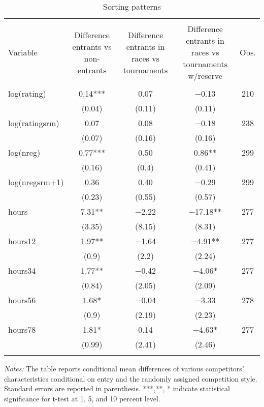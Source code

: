 \documentclass[11pt, titlepage]{article}
\begin{document}
\begin{table}
\centering
\caption{Sorting patterns}
\label{sorting table}
\begin{tabular}{@{}lcccc}
  \\[-1.8ex]\hline\hline\\[-1.8ex]
Variable & \multicolumn{1}{L{2cm}}{Difference entrants vs non-entrants} & \multicolumn{1}{L{2cm}}{Difference entrants in races vs tournaments} & \multicolumn{1}{L{2cm}}{Difference entrants in races vs tournaments w/reserve} & Obs. \\ 
  \hline\\[-1.86ex]
log(rating) &  0.14*** &  0.07 &  $-$0.13 & 210 \\ 
   & (0.04) & (0.11) & (0.11) &  \\ 
  log(ratingsrm) &  0.07 &  0.08 &  $-$0.18 & 238 \\ 
   & (0.07) & (0.16) & (0.16) &  \\ 
  log(nreg) &  0.77*** &  0.50 &   0.86** & 299 \\ 
   & (0.16) & (0.4) & (0.41) &  \\ 
  log(nregsrm+1) &  0.36 &  0.40 &  $-$0.29 & 299 \\ 
   & (0.23) & (0.55) & (0.57) &  \\ 
  hours &  7.31** & $-$2.22 & $-$17.18** & 277 \\ 
   & (3.35) & (8.15) & (8.31) &  \\ 
  hours12 &  1.97** & $-$1.64 &  $-$4.91** & 277 \\ 
   & (0.9) & (2.2) & (2.24) &  \\ 
  hours34 &  1.77** & $-$0.42 &  $-$4.06* & 277 \\ 
   & (0.84) & (2.05) & (2.09) &  \\ 
  hours56 &  1.68* & $-$0.04 &  $-$3.33 & 278 \\ 
   & (0.9) & (2.19) & (2.23) &  \\ 
  hours78 &  1.81* &  0.14 &  $-$4.63* & 277 \\ 
   & (0.99) & (2.41) & (2.46) &  \\ 
   \hline\\[-1.8ex]
\end{tabular}
\begin{minipage}{\textwidth}
\footnotesize\emph{Notes:}{ The table reports conditional mean differences of various competitors' characteristics conditional on entry and the randomly assigned competition style. Standard errors are reported in parenthesis. ***,**, * indicate statistical significance for t-test at 1, 5, and 10 percent level.
}\end{minipage}
\end{table}
\end{document}

